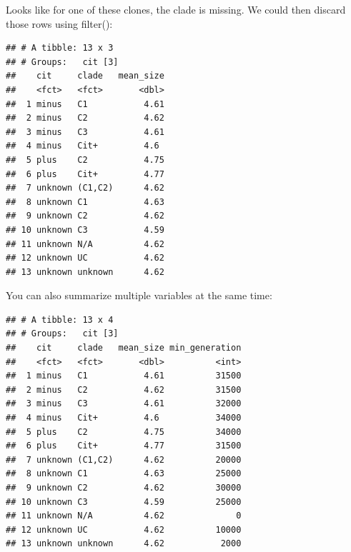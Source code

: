 \documentclass[]{book}
\newenvironment{Shaded}{\begin{snugshade}}{\end{snugshade}}
\newcommand{\DataTypeTok}[1]{\textcolor[rgb]{0.13,0.29,0.53}{#1}}
\newcommand{\KeywordTok}[1]{\textcolor[rgb]{0.13,0.29,0.53}{\textbf{#1}}}
\newcommand{\NormalTok}[1]{#1}
\newcommand{\OperatorTok}[1]{\textcolor[rgb]{0.81,0.36,0.00}{\textbf{#1}}}
\newcommand{\OtherTok}[1]{\textcolor[rgb]{0.56,0.35,0.01}{#1}}
\newcommand{\StringTok}[1]{\textcolor[rgb]{0.31,0.60,0.02}{#1}}
\begin{document}
Looks like for one of these clones, the clade is missing. We could then discard those rows using filter():

\begin{Shaded}
\end{Shaded}

\begin{verbatim}
## # A tibble: 13 x 3
## # Groups:   cit [3]
##    cit     clade   mean_size
##    <fct>   <fct>       <dbl>
##  1 minus   C1           4.61
##  2 minus   C2           4.62
##  3 minus   C3           4.61
##  4 minus   Cit+         4.6 
##  5 plus    C2           4.75
##  6 plus    Cit+         4.77
##  7 unknown (C1,C2)      4.62
##  8 unknown C1           4.63
##  9 unknown C2           4.62
## 10 unknown C3           4.59
## 11 unknown N/A          4.62
## 12 unknown UC           4.62
## 13 unknown unknown      4.62
\end{verbatim}

You can also summarize multiple variables at the same time:

\begin{Shaded}
\end{Shaded}

\begin{verbatim}
## # A tibble: 13 x 4
## # Groups:   cit [3]
##    cit     clade   mean_size min_generation
##    <fct>   <fct>       <dbl>          <int>
##  1 minus   C1           4.61          31500
##  2 minus   C2           4.62          31500
##  3 minus   C3           4.61          32000
##  4 minus   Cit+         4.6           34000
##  5 plus    C2           4.75          34000
##  6 plus    Cit+         4.77          31500
##  7 unknown (C1,C2)      4.62          20000
##  8 unknown C1           4.63          25000
##  9 unknown C2           4.62          30000
## 10 unknown C3           4.59          25000
## 11 unknown N/A          4.62              0
## 12 unknown UC           4.62          10000
## 13 unknown unknown      4.62           2000
\end{verbatim}
\end{document}
